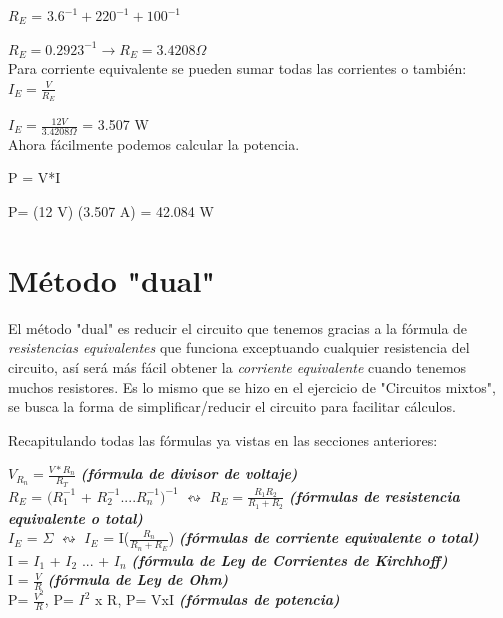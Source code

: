 \documentclass[a4paper,11pt]{article}
\begin{document}
$R_E$ = $3.6^{-1} + 220^{-1} + 100^{-1}$

$R_E = 0.2923^{-1} \longrightarrow R_E= 3.4208 \Omega$ 
\vspace{0.5cm}\\
Para corriente equivalente se pueden sumar todas las corrientes o también:
\vspace{0.5cm}\\
$I_E = \frac{V}{R_E}$ 

$I_E = \frac{12 V}{3.4208 \Omega}$ = 3.507 W
\vspace{0.5cm}\\
Ahora fácilmente podemos calcular la potencia.

P = V*I 

P= (12 V) (3.507 A) = 42.084 W
\section{Método "dual"}
El método "dual" es reducir el circuito que tenemos gracias a la fórmula de \textit{resistencias equivalentes} que funciona exceptuando cualquier resistencia del circuito, así será más fácil obtener la \textit{corriente equivalente} cuando tenemos muchos resistores. Es lo mismo que se hizo en el ejercicio de "Circuitos mixtos", se busca la forma de simplificar/reducir el circuito para facilitar cálculos.

\noindent Recapitulando todas las fórmulas ya vistas en las secciones anteriores: 
\begin{center}

    $V_{R_n} = \frac{V*R_n}{R_T}$ \textcolor[cmyk]{1,0,1,0}{\textbf{\textit{(fórmula de divisor de voltaje)}}}
\vspace{0.3cm}\\
$R_E$ = $(R_1^{-1}$ + $R_2^{-1}$....$R_n^{-1})^{-1}$ $\leftrightsquigarrow$  $R_E = \frac{R_1R_2}{R_1+R_2}$ \textcolor[cmyk]{1,0,1,0}{\textbf{\textit{(fórmulas de resistencia equivalente o total)}}}
\vspace{0.3cm}\\
   $I_E$ = $\Sigma$ $\leftrightsquigarrow$ $I_E$ = I($\frac{R_n}{R_n+R_E}$) \textcolor[cmyk]{1,0,1,0}{\textbf{\textit{(fórmulas de corriente equivalente o total)}}}
\vspace{0.3cm}\\
I = $I_1$ + $I_2$ ... + $I_n$ \textcolor[cmyk]{1,0,1,0}{\textbf{\textit{(fórmula de Ley de Corrientes de Kirchhoff)}}}
\vspace{0.3cm}\\
I = $\frac{V}{R}$ \textcolor[cmyk]{1,0,1,0}{\textbf{\textit{(fórmula de Ley de Ohm)}}}
\vspace{0.3cm}\\
P= $\frac{V^2}{R}$, P= $I^2$ x R, P= VxI \textcolor[cmyk]{1,0,1,0}{\textbf{\textit{(fórmulas de potencia)}}}
\end{center}
\end{document}
